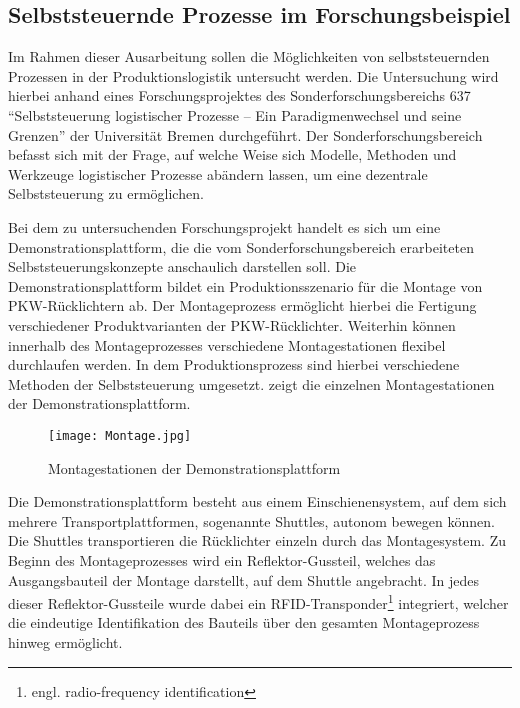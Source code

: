 \subsection{Selbststeuernde Prozesse im Forschungsbeispiel}
\label{sec:Forschungsbeispiel_SFB}
Im Rahmen dieser Ausarbeitung sollen die Möglichkeiten von selbststeuernden
Prozessen in der Produktionslogistik untersucht werden. Die Untersuchung wird
hierbei anhand eines Forschungsprojektes des Sonderforschungsbereichs 637
"`Selbststeuerung logistischer Prozesse – Ein Paradigmenwechsel und seine
Grenzen"' der Universität Bremen durchgeführt. Der Sonderforschungsbereich
befasst sich mit der Frage, auf welche Weise sich Modelle, Methoden und
Werkzeuge logistischer Prozesse abändern lassen, um eine dezentrale 
Selbststeuerung zu ermöglichen.

Bei dem zu untersuchenden Forschungsprojekt handelt es sich um eine
Demonstrationsplattform, die die vom Sonderforschungsbereich erarbeiteten
Selbststeuerungskonzepte anschaulich darstellen soll. Die
Demonstrationsplattform bildet ein Produktionsszenario für die Montage von
PKW-Rücklichtern ab. Der Montageprozess ermöglicht hierbei die Fertigung
verschiedener Produktvarianten der PKW-Rücklichter. Weiterhin können innerhalb
des Montageprozesses verschiedene Montagestationen flexibel durchlaufen werden.
In dem Produktionsprozess sind hierbei verschiedene Methoden der
Selbststeuerung umgesetzt.  zeigt die einzelnen
Montagestationen der Demonstrationsplattform.

\begin{figure}[htb] 
\centering
\texttt{[image: Montage.jpg]}
\caption[Montagestation]{Montagestationen der Demonstrationsplattform\protect\footnotemark}
\label{fig:Montagestation}
\end{figure}

Die Demonstrationsplattform besteht aus einem Einschienensystem, auf dem sich
mehrere Transportplattformen, sogenannte Shuttles, autonom bewegen können. Die
Shuttles transportieren die Rücklichter einzeln durch das Montagesystem. Zu
Beginn des Montageprozesses wird ein Reflektor-Gussteil, welches das
Ausgangsbauteil der Montage darstellt, auf dem Shuttle angebracht. In jedes
dieser Reflektor-Gussteile wurde dabei ein RFID-Transponder\footnote{engl.
radio-frequency identification} integriert, welcher die eindeutige
Identifikation des Bauteils über den gesamten Montageprozess hinweg ermöglicht.

